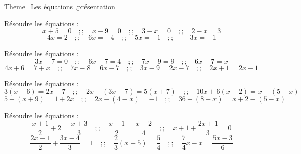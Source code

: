\documentclass[a4paper,12pt]{article}
\begin{document}
\begin{Maquette}[Fiche]{Theme=Les équations ,présentation}

\begin{exercice}
Résoudre les équations :
\[
x+5=0\quad ;; \quad
x-9=0\quad ;; \quad
3-x=0\quad ;; \quad
2-x=3
\]
\[
4x=2\quad ;; \quad
6x=-4\quad ;; \quad
5x=-1\quad ;; \quad
-3x=-1
\]
\end{exercice}

\begin{exercice}
Résoudre les équations :
\[
3x-7=0\quad ;; \quad
6x-7=4\quad ;; \quad
7x-9=9\quad ;; \quad
6x-7=x
\]
\[
4x+6=7+x\quad ;; \quad
7x-8=6x-7\quad ;; \quad
3x-9=2x-7\quad ;; \quad
2x+1=2x-1
\]
\end{exercice}

\begin{exercice}
Résoudre les équations :
\[
3(x+6)=2x-7\quad ;; \quad
2x-(3x-7)=5(x+7)\quad ;; \quad
10x+6(x-2)=x-(5-x)
\]
\[
5-(x+9)=1+2x\quad ;; \quad
2x-(4-x)=-1\quad ;; \quad
36-(8-x)=x+2-(5-x)
\]
\end{exercice}

\begin{exercice}
Résoudre les équations :
\[
\dfrac{x+1}{2}+2=\dfrac{x+3}{3}\quad ;; \quad
\dfrac{x+1}{2}=\dfrac{x+2}{4}\quad ;; \quad
x+1+\dfrac{2x+1}{3}=0
\]
\[
\dfrac{2x-1}{2}+\dfrac{3x-4}{3}=1\quad ;; \quad
\dfrac{2}{3}(x+5)=\dfrac{5}{4}\quad ;; \quad
\dfrac{7}{4}x-x=\dfrac{5x-3}{6}
\]
\end{exercice}


\end{Maquette}
\end{document}
